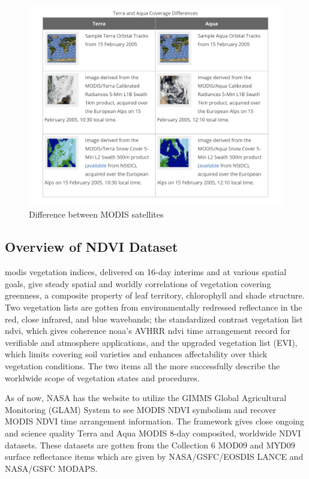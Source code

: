  \begin{figure}[H]
            \centering
            \includegraphics[width=1.0\linewidth]{figures/ch3/satellites.png}
            \caption{\label{fig:modis_satellites_difference} Difference between MODIS satellites}
    \end{figure}

\subsection{Overview of NDVI Dataset}

\gls{modis} vegetation indices, delivered on 16-day interims and at various spatial goals, give steady spatial and worldly correlations of vegetation covering greenness, a composite property of leaf territory, chlorophyll and shade structure. Two vegetation lists are gotten from environmentally redressed reflectance in the red, close infrared, and blue wavebands; the standardized contrast vegetation list \gls{ndvi}, which gives coherence \gls{noaa}'s AVHRR \gls{ndvi} time arrangement record for verifiable and atmosphere applications, and the upgraded vegetation list (EVI), which limits covering soil varieties and enhances affectability over thick vegetation conditions. The two items all the more successfully describe the worldwide scope of vegetation states and procedures. 

As of now, NASA has the website to utilize the GIMMS Global Agricultural Monitoring (GLAM) System to see MODIS NDVI symbolism and recover MODIS NDVI time arrangement information. The framework gives close ongoing and science quality Terra and Aqua MODIS 8-day composited, worldwide NDVI datasets. These datasets are gotten from the Collection 6 MOD09 and MYD09 surface reflectance items which are given by NASA/GSFC/EOSDIS LANCE and NASA/GSFC MODAPS.

